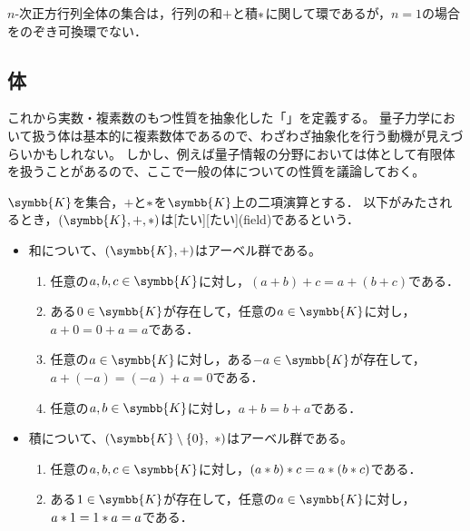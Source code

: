 \documentclass[../sotsu.tex]{subfiles}
\begin{document}
\begin{example}
    $n$-次正方行列全体の集合は，行列の和$+$と積$\mathbin{\ast}$に関して環であるが，$n = 1$の場合をのぞき可換環でない．
\end{example}



\subsection{体}

これから実数・複素数のもつ性質を抽象化した「」を定義する。
量子力学において扱う体は基本的に複素数体であるので、わざわざ抽象化を行う動機が見えづらいかもしれない。
しかし、例えば量子情報の分野においては体として有限体を扱うことがあるので、ここで一般の体についての性質を議論しておく。

\begin{definition}[体]
    \label{dfn:field}
    $\symbb{K}$を集合，$+$と$\mathbin{\ast}$を$\symbb{K}$上の二項演算とする．
    以下がみたされるとき，$(\symbb{K}, +, \dotprod)$は[たい][たい](field)であるという．
    \begin{itemize}
        \item 和について、$(\symbb{K}, +)$はアーベル群である。
        \begin{enumerate}
            \item \label{field:sum-associative} 任意の$a, b, c \in \symbb{K}$に対し，$(a + b) + c = a + (b + c)$である．
            \item \label{field:sum-zero} ある$0 \in \symbb{K}$が存在して，任意の$a \in \symbb{K}$に対し，$a + 0 = 0 + a = a$である．
            \item \label{field:sum-opposite} 任意の$a \in \symbb{K}$に対し，ある$-a \in \symbb{K}$が存在して，$a + (-a) = (-a) + a = 0$である．
            \item \label{field:sum-commutative} 任意の$a, b \in \symbb{K}$に対し，$a + b = b + a$である．
        \end{enumerate}
        \item 積について、$(\symbb{K} \setminus \{ 0 \}, \  \dotprod)$はアーベル群である。
        \begin{enumerate}[resume]
            \item \label{field:prod-associative} 任意の$a, b, c \in \symbb{K}$に対し，$(a \mathbin{\ast} b) \mathbin{\ast} c = a \mathbin{\ast} (b \mathbin{\ast} c)$である．
            \item \label{field:prod-one} ある$1 \in \symbb{K}$が存在して，任意の$a \in \symbb{K}$に対し，$a \mathbin{\ast} 1 = 1 \mathbin{\ast} a = a$である．

\end{enumerate}
\end{itemize}
\end{definition}
\end{document}
